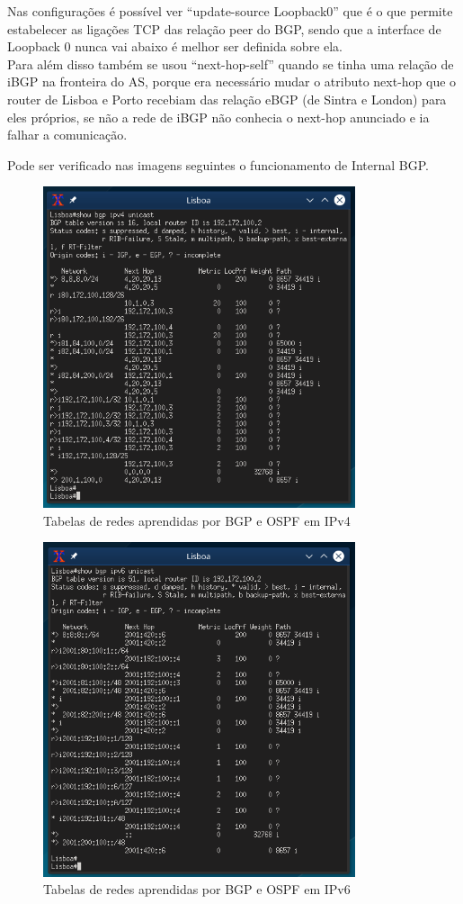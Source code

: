 \documentclass[11pt,a4paper]{report}
\begin{document}
Nas configurações é possível ver ``update-source Loopback0'' que é o que permite estabelecer as ligações TCP das relação peer do BGP, sendo que a interface de Loopback 0 nunca vai abaixo é melhor ser definida sobre ela.\\

Para além disso também se usou ``next-hop-self'' quando se tinha uma relação de iBGP na fronteira do AS, porque era necessário mudar o atributo next-hop que o router de Lisboa e Porto recebiam das relação eBGP (de Sintra e London) para eles próprios, se não a rede de iBGP não conhecia o next-hop anunciado e ia falhar a comunicação.

Pode ser verificado nas imagens seguintes o funcionamento de Internal BGP.

\begin{figure}[H]
\centerline{\includegraphics[width=260pt]{lisboa_bgp_ipv4.png}}
\caption{Tabelas de redes aprendidas por BGP e OSPF em IPv4}
\label{schema}
\end{figure}

\begin{figure}[H]
\centerline{\includegraphics[width=260pt]{lisboa_bgp_ipv6.png}}
\caption{Tabelas de redes aprendidas por BGP e OSPF em IPv6}
\label{schema}
\end{figure}
\end{document}
